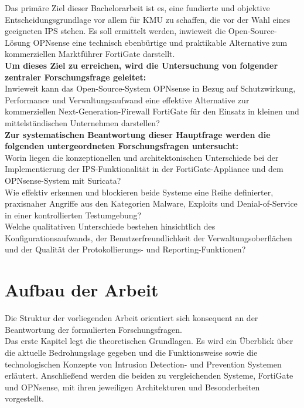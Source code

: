 Das primäre Ziel dieser Bachelorarbeit ist es, eine fundierte und objektive Entscheidungsgrundlage vor allem für KMU zu schaffen, die vor der Wahl eines geeigneten IPS stehen. Es soll ermittelt werden, inwieweit die Open-Source-Lösung OPNsense eine technisch ebenbürtige und praktikable Alternative zum kommerziellen Marktführer FortiGate darstellt.\\

\textbf{Um dieses Ziel zu erreichen, wird die Untersuchung von folgender zentraler Forschungsfrage geleitet:}\\

Inwieweit kann das Open-Source-System OPNsense in Bezug auf Schutzwirkung, Performance und Verwaltungsaufwand eine effektive Alternative zur kommerziellen Next-Generation-Firewall FortiGate für den Einsatz in kleinen und mittelständischen Unternehmen darstellen?\\

\textbf{Zur systematischen Beantwortung dieser Hauptfrage werden die folgenden untergeordneten Forschungsfragen untersucht:}\\

Worin liegen die konzeptionellen und architektonischen Unterschiede bei der Implementierung der IPS-Funktionalität in der FortiGate-Appliance und dem OPNsense-System mit Suricata?\\

Wie effektiv erkennen und blockieren beide Systeme eine Reihe definierter, praxisnaher Angriffe aus den Kategorien Malware, Exploits und Denial-of-Service in einer kontrollierten Testumgebung?\\

Welche qualitativen Unterschiede bestehen hinsichtlich des Konfigurationsaufwands, der Benutzerfreundlichkeit der Verwaltungsoberflächen und der Qualität der Protokollierungs- und Reporting-Funktionen?

\section{Aufbau der Arbeit}

Die Struktur der vorliegenden Arbeit orientiert sich konsequent an der Beantwortung der formulierten Forschungsfragen.\\

Das erste Kapitel legt die theoretischen Grundlagen. Es wird ein Überblick über die aktuelle Bedrohungslage gegeben und die Funktionsweise sowie die technologischen Konzepte von Intrusion Detection- und Prevention Systemen erläutert. Anschließend werden die beiden zu vergleichenden Systeme, FortiGate und OPNsense, mit ihren jeweiligen Architekturen und Besonderheiten vorgestellt.\\

